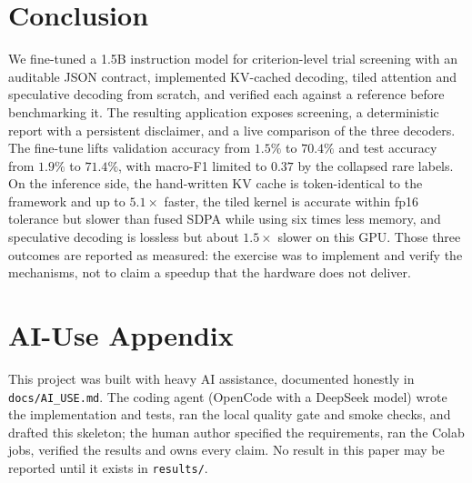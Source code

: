 \documentclass[conference]{IEEEtran}
\begin{document}
\section{Conclusion}
We fine-tuned a 1.5B instruction model for criterion-level trial screening with an auditable JSON
contract, implemented KV-cached decoding, tiled attention and speculative decoding from scratch, and
verified each against a reference before benchmarking it. The resulting application exposes
screening, a deterministic report with a persistent disclaimer, and a live comparison of the three
decoders. The fine-tune lifts validation accuracy from $1.5\%$ to $70.4\%$ and test accuracy from
$1.9\%$ to $71.4\%$, with macro-F1 limited to $0.37$ by the collapsed rare labels. On the inference
side, the hand-written KV cache is token-identical to the framework and up to $5.1\times$ faster,
the tiled kernel is accurate within fp16 tolerance but slower than fused SDPA while using six times
less memory, and speculative decoding is lossless but about $1.5\times$ slower on this GPU. Those three outcomes are
reported as measured: the exercise was to implement and verify the mechanisms, not to claim a
speedup that the hardware does not deliver.

\section*{AI-Use Appendix}
This project was built with heavy AI assistance, documented honestly in \texttt{docs/AI\_USE.md}.
The coding agent (OpenCode with a DeepSeek model) wrote the implementation and tests, ran the local
quality gate and smoke checks, and drafted this skeleton; the human author specified the
requirements, ran the Colab jobs, verified the results and owns every claim. No result in this paper
may be reported until it exists in \texttt{results/}.



\end{document}
